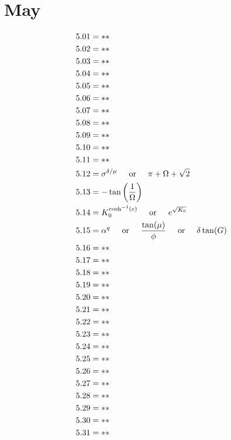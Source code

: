 \documentclass[12pt]{article}
\newcommand{\oder}{\hspace{5mm}\text{or}\hspace{5mm}}
\begin{document}
\section{May}
\begin{align*}
5.01 &= **\\
5.02 &= **\\
5.03 &= **\\
5.04 &= **\\
5.05 &= **\\
5.06 &= **\\
5.07 &= **\\
5.08 &= **\\
5.09 &= **\\
5.10 &= **\\
5.11 &= **\\
5.12 &= \sigma^{\delta / \mu} \oder \pi + \Omega + \sqrt{2}\\
5.13 &= -\tan\left(\frac{1}{\Omega}\right)\\
5.14 &= K_{0}^{\cosh^{-1}(e)} \oder e^{\sqrt{K_{0}}}\\
5.15 &= \alpha^{q} \oder \frac{\tan(\mu)}{\phi} \oder \delta\tan(G)\\
5.16 &= **\\
5.17 &= **\\
5.18 &= **\\
5.19 &= **\\
5.20 &= **\\
5.21 &= **\\
5.22 &= **\\
5.23 &= **\\
5.24 &= **\\
5.25 &= **\\
5.26 &= **\\
5.27 &= **\\
5.28 &= **\\
5.29 &= **\\
5.30 &= **\\
5.31 &= **\\
\end{align*}

\pagebreak
\end{document}
